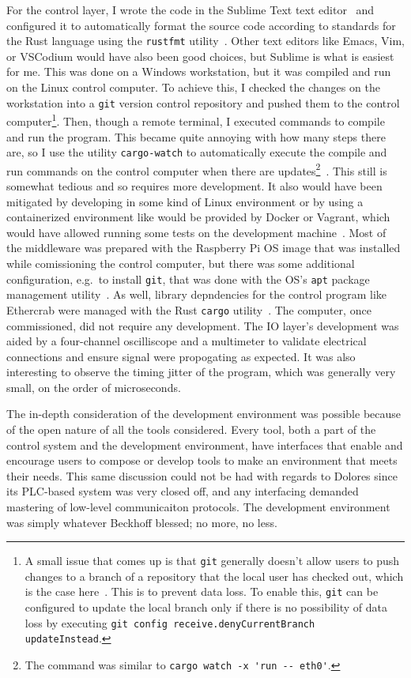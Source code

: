 \documentclass[english,12pt,a4paper,pdftex,eng,utf8]{aaltothesis}
\begin{document}
For the control layer, I wrote the code in the Sublime Text text editor~\cite{SublimeText} and configured it to automatically format the source code according to standards for the Rust language using the \verb|rustfmt| utility~\cite{rustfmt}.  Other text editors like Emacs, Vim, or VSCodium would have also been good choices, but Sublime is what is easiest for me.  This was done on a Windows workstation, but it was compiled and run on the Linux control computer.  To achieve this, I checked the changes on the workstation into a \verb|git| version control repository and pushed them to the control computer\footnote{A small issue that comes up is that \verb|git| generally doesn't allow users to push changes to a branch of a repository that the local user has checked out, which is the case here~\cite{GitConfigReceiveDenyCurrentBranch}.  This is to prevent data loss.  To enable this, \verb|git| can be configured to update the local branch only if there is no possibility of data loss by executing \verb|git config receive.denyCurrentBranch updateInstead|.}.  Then, though a remote terminal, I executed commands to compile and run the program.  This became quite annoying with how many steps there are, so I use the utility \verb|cargo-watch| to automatically execute the compile and run commands on the control computer when there are updates\footnote{The command was similar to \verb|cargo watch -x 'run -- eth0'|.}~\cite{CargoWatch}.  This still is somewhat tedious and so requires more development.  It also would have been mitigated by developing in some kind of Linux environment or by using a containerized environment like would be provided by Docker or Vagrant, which would have allowed running some tests on the development machine~\cite{DockerDev,VagrantDev}.  Most of the middleware was prepared with the Raspberry Pi OS image that was installed while comissioning the control computer, but there was some additional configuration, e.g.\ to install \verb|git|, that was done with the OS's \verb|apt| package management utility~\cite{apt}.  As well, library depndencies for the control program like Ethercrab were managed with the Rust \verb|cargo| utility~\cite{Cargo}.  The computer, once commissioned, did not require any development.  The IO layer's development was aided by a four-channel oscilliscope and a multimeter to validate electrical connections and ensure signal were propogating as expected.  It was also interesting to observe the timing jitter of the program, which was generally very small, on the order of microseconds.

The in-depth consideration of the development environment was possible because of the open nature of all the tools considered.  Every tool, both a part of the control system and the development environment, have interfaces that enable and encourage users to compose or develop tools to make an environment that meets their needs.  This same discussion could not be had with regards to Dolores since its PLC-based system was very closed off, and any interfacing demanded mastering of low-level communicaiton protocols.  The development environment was simply whatever Beckhoff blessed; no more, no less.
\end{document}
